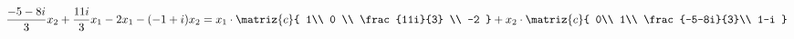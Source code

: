 \begin{enumerate}[label=(\alph*)]
$${{              \frac{-5-8i}{3}x_2 + \frac{11i}{3}x_1 \\
              -2x_1-(-1+i)x_2              
            }
            =
            x_1 \cdot
            \matriz{c}{
              1\\
              0 \\
              \frac{11i}{3} \\
              -2
            }
            +
            x_2 \cdot
            \matriz{c}{
              0\\
              1\\
              \frac{-5-8i}{3}\\
              1-i
            }
          }
        $$

\end{enumerate}

\begin{aportes}
  \item {}
   \item {}
\end{aportes}
